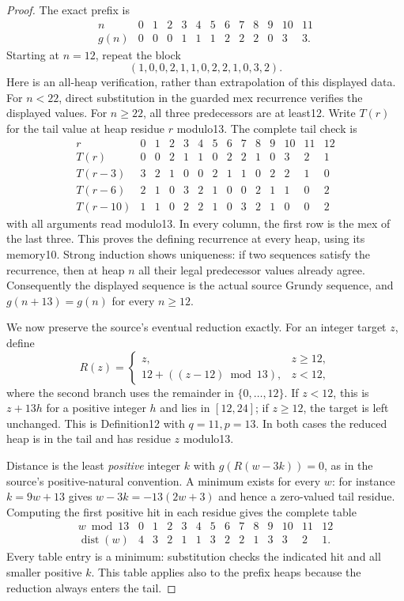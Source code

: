 \documentclass[11pt]{article}
\newcommand{\dist}{\operatorname{dist}}
\begin{document}
\begin{proof}
The exact prefix is
\[
\begin{array}{c|rrrrrrrrrrrr}
n&0&1&2&3&4&5&6&7&8&9&10&11\\\hline
g(n)&0&0&0&1&1&1&2&2&2&0&3&3.
\end{array}
\]
Starting at $n=12$, repeat the block
\[
 (1,0,0,2,1,1,0,2,2,1,0,3,2).
\]
Here is an all-heap verification, rather than extrapolation of this displayed data. For $n<22$, direct substitution in the guarded mex recurrence verifies the displayed values. For $n\ge22$, all three predecessors are at least12. Write $T(r)$ for the tail value at heap residue $r$ modulo13. The complete tail check is
\[
\begin{array}{c|rrrrrrrrrrrrr}
r&0&1&2&3&4&5&6&7&8&9&10&11&12\\\hline
T(r)&0&0&2&1&1&0&2&2&1&0&3&2&1\\
T(r-3)&3&2&1&0&0&2&1&1&0&2&2&1&0\\
T(r-6)&2&1&0&3&2&1&0&0&2&1&1&0&2\\
T(r-10)&1&1&0&2&2&1&0&3&2&1&0&0&2
\end{array}
\]
with all arguments read modulo13. In every column, the first row is the mex of the last three. This proves the defining recurrence at every heap, using its memory10. Strong induction shows uniqueness: if two sequences satisfy the recurrence, then at heap $n$ all their legal predecessor values already agree. Consequently the displayed sequence is the actual source Grundy sequence, and $g(n+13)=g(n)$ for every $n\ge12$.

We now preserve the source's eventual reduction exactly. For an integer target $z$, define
\[
 R(z)=\begin{cases}z,&z\ge12,\\12+((z-12)\bmod13),&z<12,\end{cases}
\]
where the second branch uses the remainder in $\{0,\ldots,12\}$. If $z<12$, this is $z+13h$ for a positive integer $h$ and lies in $[12,24]$; if $z\ge12$, the target is left unchanged. This is Definition12 with $q=11,p=13$. In both cases the reduced heap is in the tail and has residue $z$ modulo13.

Distance is the least \emph{positive} integer $k$ with $g(R(w-3k))=0$, as in the source's positive-natural convention. A minimum exists for every $w$: for instance $k=9w+13$ gives $w-3k=-13(2w+3)$ and hence a zero-valued tail residue. Computing the first positive hit in each residue gives the complete table
\[
\begin{array}{c|rrrrrrrrrrrrr}
w\bmod13&0&1&2&3&4&5&6&7&8&9&10&11&12\\\hline
\dist(w)&4&3&2&1&1&3&2&2&1&3&3&2&1.
\end{array}
\]
Every table entry is a minimum: substitution checks the indicated hit and all smaller positive $k$. This table applies also to the prefix heaps because the reduction always enters the tail.


\end{proof}
\end{document}
